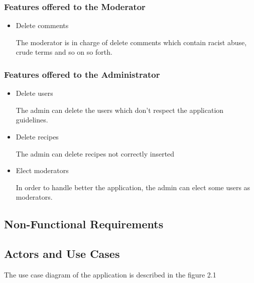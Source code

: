 \documentclass[a4paper]{report}
\begin{document}
\subsubsection{Features offered to the Moderator}
\begin{itemize}
	\item Delete comments
	
	\noindent The moderator is in charge of delete comments which contain racist abuse, crude terms and so on so forth.
\end{itemize}

\subsubsection{Features offered to the Administrator}
\begin{itemize}
	\item Delete users
	
	\noindent The admin can delete the users which don't respect the application guidelines.
	
	\item Delete recipes
	
	\noindent The admin can delete recipes not correctly inserted
	
	\item Elect moderators
	
	\noindent In order to handle better the application, the admin can elect some users as moderators.
\end{itemize}
\subsection{Non-Functional Requirements}

\subsection{Actors and Use Cases}
The use case diagram of the application is described in the figure 2.1
\end{document}
